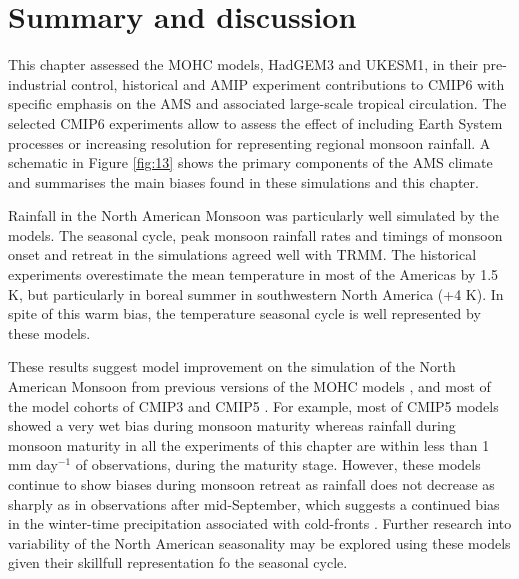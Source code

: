 \section{Summary and discussion}



 This chapter assessed the MOHC models, HadGEM3 and UKESM1, in their pre-industrial control, historical and AMIP experiment contributions to CMIP6 with specific emphasis on the AMS and associated large-scale tropical circulation. The selected CMIP6 experiments allow to assess the effect of including Earth System processes or increasing resolution for representing regional monsoon rainfall. 
A schematic in Figure \ref{fig:13} shows the primary components of the AMS climate and summarises the main biases found in these simulations and this chapter.



Rainfall in the North American Monsoon was particularly well simulated by the models. The seasonal cycle, peak monsoon rainfall rates and timings of monsoon onset and retreat in the simulations agreed well with TRMM. The historical experiments overestimate the mean temperature in most of the Americas by 1.5 K, but particularly in boreal summer in southwestern North America (+4 K). In spite of this warm bias, the temperature seasonal cycle is well represented by these models. 

  These results suggest model improvement on the simulation of the North American Monsoon from previous versions of the MOHC models \citep{arritt2000}, and most of the model cohorts of CMIP3 and CMIP5 \citep{geil2013}. For example, most of CMIP5 models showed a very wet bias during monsoon maturity whereas rainfall during monsoon maturity in all the experiments of this chapter are within less than 1 mm day$^{-1}$ of observations, during the maturity stage. However, these models continue to show biases during monsoon retreat as rainfall does not decrease as sharply as in observations after mid-September, which suggests a continued bias in the winter-time precipitation associated with cold-fronts \citep{adams1997}. Further research into variability of the North American seasonality may be explored using these models given their skillfull representation fo the seasonal cycle.

